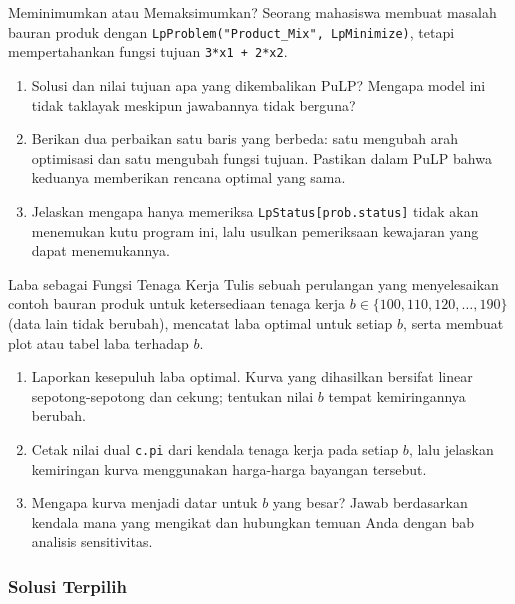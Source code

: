 \begin{ex}{Meminimumkan atau Memaksimumkan?}{}
\label{ex:pulp-sense}
Seorang mahasiswa membuat masalah bauran produk dengan \texttt{LpProblem("Product\_Mix", LpMinimize)}, tetapi mempertahankan fungsi tujuan \texttt{3*x1 + 2*x2}.
\begin{enumerate}
\item Solusi dan nilai tujuan apa yang dikembalikan PuLP? Mengapa model ini tidak taklayak meskipun jawabannya tidak berguna?
\item Berikan dua perbaikan satu baris yang berbeda: satu mengubah arah optimisasi dan satu mengubah fungsi tujuan. Pastikan dalam PuLP bahwa keduanya memberikan rencana optimal yang sama.
\item Jelaskan mengapa hanya memeriksa \texttt{LpStatus[prob.status]} tidak akan menemukan kutu program ini, lalu usulkan pemeriksaan kewajaran yang dapat menemukannya.
\end{enumerate}
\end{ex}


\begin{ex}{Laba sebagai Fungsi Tenaga Kerja}{}
\label{ex:pulp-rhs-sweep}
Tulis sebuah perulangan yang menyelesaikan contoh bauran produk untuk ketersediaan tenaga kerja $b \in \{100, 110, 120, \ldots, 190\}$ (data lain tidak berubah), mencatat laba optimal untuk setiap $b$, serta membuat plot atau tabel laba terhadap $b$.
\begin{enumerate}
\item Laporkan kesepuluh laba optimal. Kurva yang dihasilkan bersifat linear sepotong-sepotong dan cekung; tentukan nilai $b$ tempat kemiringannya berubah.
\item Cetak nilai dual \texttt{c.pi} dari kendala tenaga kerja pada setiap $b$, lalu jelaskan kemiringan kurva menggunakan harga-harga bayangan tersebut.
\item Mengapa kurva menjadi datar untuk $b$ yang besar? Jawab berdasarkan kendala mana yang mengikat dan hubungkan temuan Anda dengan bab analisis sensitivitas.
\end{enumerate}
\end{ex}

\subsubsection*{Solusi Terpilih}

